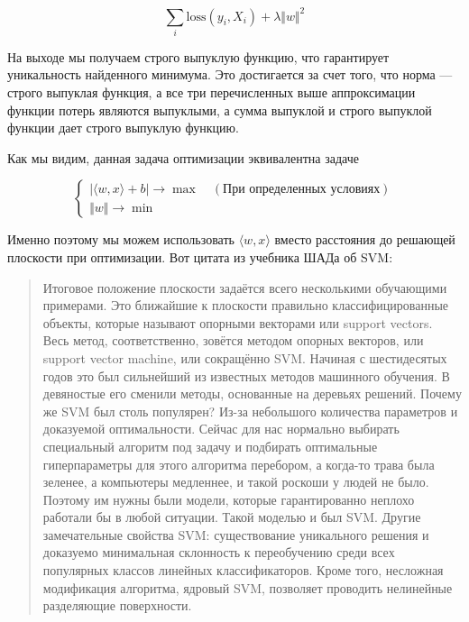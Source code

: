 \documentclass{article}
\begin{document}
    \begin{equation}
        \sum_{i} \text{loss}(y_{i}, X_{i}) + \lambda \Vert w \Vert^{2}
    \end{equation}
    
    На выходе мы получаем строго выпуклую функцию, что гарантирует уникальность найденного минимума.
    Это достигается за счет того, что норма --- строго выпуклая функция, а все три перечисленных выше 
    аппроксимации функции потерь
    являются выпуклыми, а сумма выпуклой и строго выпуклой функции дает строго выпуклую функцию.

    Как мы видим, данная задача оптимизации эквивалентна задаче

    \[
        \begin{cases}
            |\langle w, x \rangle + b| \rightarrow \max \quad (\text{При определенных условиях})\\ 
            \Vert w \Vert \rightarrow \min 
        \end{cases}
    \]

    Именно поэтому мы можем использовать $\langle w, x \rangle$ вместо расстояния до решающей плоскости при 
    оптимизации. Вот цитата из учебника ШАДа об SVM: 

    \begin{quote}
        Итоговое положение плоскости задаётся всего несколькими обучающими примерами. 
        Это ближайшие к плоскости правильно классифицированные объекты, 
        которые называют опорными векторами или support vectors. 
        Весь метод, соответственно, зовётся методом опорных векторов, 
        или support vector machine, или сокращённо SVM. 
        Начиная с шестидесятых годов это был сильнейший из известных методов машинного обучения. 
        В девяностые его сменили методы, основанные на деревьях решений.
        Почему же SVM был столь популярен? 
        Из-за небольшого количества параметров и доказуемой оптимальности. 
        Сейчас для нас нормально выбирать специальный алгоритм под задачу и подбирать 
        оптимальные гиперпараметры для этого алгоритма перебором, 
        а когда-то трава была зеленее, а компьютеры медленнее, 
        и такой роскоши у людей не было. 
        Поэтому им нужны были модели, которые гарантированно неплохо работали бы в любой ситуации. 
        Такой моделью и был SVM.
        Другие замечательные свойства SVM: существование уникального решения и 
        доказуемо минимальная склонность к переобучению среди всех популярных классов 
        линейных классификаторов. 
        Кроме того, несложная модификация алгоритма, ядровый SVM, 
        позволяет проводить нелинейные разделяющие поверхности.
    \end{quote}
\end{document}

